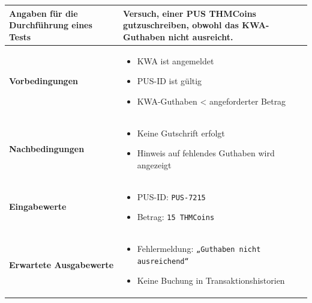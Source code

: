 \documentclass[a4paper,12pt]{article}
\begin{document}
\renewcommand{\arraystretch}{1.3}
\begin{center}
\begin{tabular}{|p{5cm}|p{10.5cm}|}
\hline
\textbf{Angaben für die Durchführung eines Tests} & 
Versuch, einer PUS THMCoins gutzuschreiben, obwohl das KWA-Guthaben nicht ausreicht. \\
\hline
\textbf{Vorbedingungen} &
\begin{minipage}[t]{10.5cm}
\begin{itemize}[leftmargin=*]
  \item KWA ist angemeldet
  \item PUS-ID ist gültig
  \item KWA-Guthaben < angeforderter Betrag
\end{itemize}
\vspace{0.2cm}
\end{minipage} \\
\hline
\textbf{Nachbedingungen} &
\begin{minipage}[t]{10.5cm}
\begin{itemize}[leftmargin=*]
  \item Keine Gutschrift erfolgt
  \item Hinweis auf fehlendes Guthaben wird angezeigt
\end{itemize}
\vspace{0.2cm}
\end{minipage} \\
\hline
\textbf{Eingabewerte} &
\begin{minipage}[t]{10.5cm}
\begin{itemize}[leftmargin=*]
  \item PUS-ID: \texttt{PUS-7215}
  \item Betrag: \texttt{15 THMCoins}
\end{itemize}
\vspace{0.2cm}
\end{minipage} \\
\hline
\textbf{Erwartete Ausgabewerte} &
\begin{minipage}[t]{10.5cm}
\begin{itemize}[leftmargin=*]
  \item Fehlermeldung: \texttt{„Guthaben nicht ausreichend“}
  \item Keine Buchung in Transaktionshistorien
\end{itemize}
\vspace{0.2cm}
\end{minipage} \\
\hline

\end{tabular}
\end{center}
\end{document}

